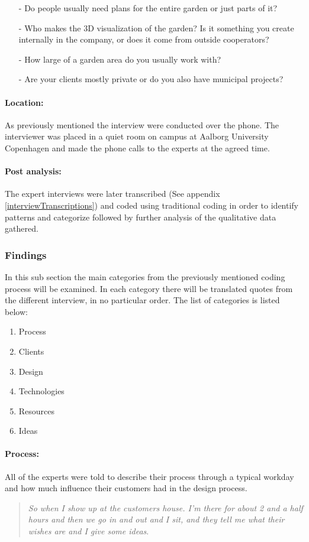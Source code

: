 \begin{itemize}
	\item[-] Do people usually need plans for the entire garden or just parts of it?
	\item[-] Who makes the 3D visualization of the garden? Is it something you create internally in the company, or does it come from outside cooperators? 
	\item[-] How large of a garden area do you usually work with?
	\item[-] Are your clients mostly private or do you also have municipal projects?
\end{itemize}

\paragraph*{Location:}
As previously mentioned the interview were conducted over the phone. The interviewer was placed in a quiet room on campus at Aalborg University Copenhagen and made the phone calls to the experts at the agreed time.

\paragraph*{Post analysis:}The expert interviews were later transcribed (See appendix \ref{interviewTranscriptions}) and coded using traditional coding in order to identify patterns and categorize followed by further analysis of the qualitative data gathered.

\subsubsection{Findings}
In this sub section the main categories from the previously mentioned coding process will be examined. In each category there will be translated quotes from the different interview, in no particular order. The list of categories is listed below:
\begin{enumerate}
	\item Process
	\item Clients
	\item Design
	\item Technologies
	\item Resources
	\item Ideas
\end{enumerate}

\paragraph*{Process:}
All of the experts were told to describe their process through a typical workday and how  much influence their customers had in the design process.
\begin{quote}
	\textit{So when I show up at the customers house. I'm there for about 2 and a half hours and then we go in and out and I sit, and they tell me what their wishes are and I give some ideas}\label{quote:expertProcess1}.\\
\end{quote}

